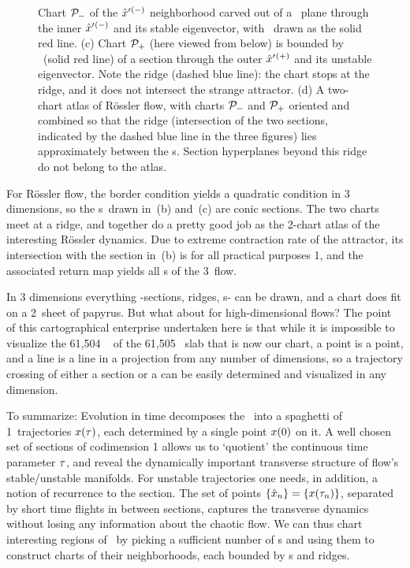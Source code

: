 \documentclass[aip,cha,reprint,
secnumarabic,
nofootinbib, tightenlines,
nobibnotes, showkeys, showpacs,
groupedaddress
]{revtex4-1}
\begin{document}
\begin{figure}
{ Chart ${\cal P}_{-}$ of the ${\hat{x}'}{}^{(-)}$ neighborhood carved out of a
 \PoincSec\ plane through the inner {\eqv} ${\hat{x}'}{}^{(-)}$ and its
 stable eigenvector, with \poincBord\ drawn as the solid red line.
(c)
  Chart ${\cal P}_{+}$ (here viewed from below) is bounded by \poincBord\
  (solid red line) of a section through the outer {\eqv}
  ${\hat{x}'}{}^{(+)}$  and its unstable eigenvector.  Note the ridge
  (dashed blue line): the chart stops at the ridge, and it does not
  intersect the strange attractor.
(d)
  A two-chart atlas of R\"ossler flow, with charts ${\cal P}_{-}$ and
  ${\cal P}_{+}$ oriented and combined so that the ridge (intersection of
  the two sections, indicated by the dashed blue line in the three
  figures) lies approximately between the \template s. Section
  hyperplanes beyond this ridge do not belong to the atlas.
    }
\label{fig:RoessTrjs}
\end{figure}

For R\"ossler flow, the border condition  yields a
quadratic condition in 3 dimensions, so the \poincBord s\ drawn in
\,(b) and \reffig{fig:RoessTrjs}\,(c) are conic
sections. The two charts meet at a ridge, and together do a pretty good
job as the 2-chart atlas of the interesting R\"ossler dynamics. Due to
extreme contraction rate of the attractor, its intersection with
the section in
\,(b) is for all practical purposes 1\dmn, and the
associated return map yields all \po s of the 3\dmn\ flow.\rf{DasBuch}

In 3 dimensions everything -sections, ridges, \poincBord s- can be
drawn, and a chart does fit on a 2\dmn\ sheet of
papyrus. But what about for high-dimensional flows? The point of this
cartographical enterprise undertaken here is that while it is impossible to
visualize the 61,504%
\dmn\ {\poincBord} of the 61,505%
\dmn\ slab that is now our chart, a point is a point,
and a line is a line in a projection from any number of dimensions, so a
trajectory crossing of either a section or a {\poincBord} can be easily
determined and visualized in any dimension.

To summarize:
Evolution in time decomposes the \statesp\ into a spaghetti of 1\dmn\
trajectories $x(\tau)$, each determined by a single point $x(0)$
on it. A well chosen set of {sections} of codimension 1 allows us to
`quotient' the continuous time parameter $\tau$, and reveal the
dynamically important transverse structure of flow's stable/unstable
manifolds. For unstable trajectories one needs, in addition, a notion of
recurrence to the section. The set of points $\{\hat{x}_n\} =
\{x(\tau_n)\}$,  separated by short time flights in between sections,
captures the transverse dynamics without losing any information about the
chaotic flow. We can thus chart interesting regions of \statesp\ by
picking a sufficient number of \template s and using them to construct
charts of their neighborhoods, each bounded by \poincBord s and ridges.
\end{document}
